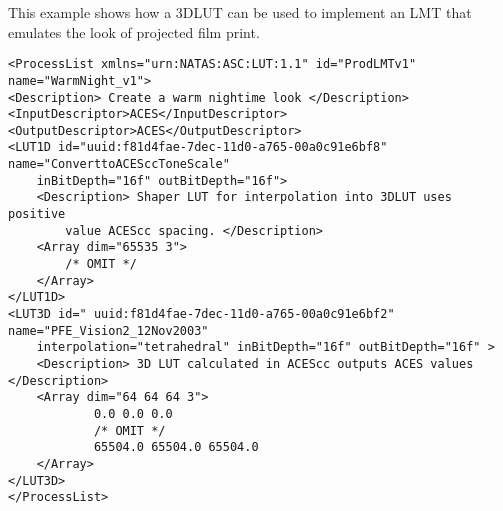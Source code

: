 \label{appendixB}

This example shows how a 3DLUT can be used to implement an LMT that emulates the look of projected film print.

\vspace{18pt}

\begin{lstlisting}
<ProcessList xmlns="urn:NATAS:ASC:LUT:1.1" id="ProdLMTv1" name="WarmNight_v1">
<Description> Create a warm nightime look </Description>
<InputDescriptor>ACES</InputDescriptor>
<OutputDescriptor>ACES</OutputDescriptor>
<LUT1D id="uuid:f81d4fae-7dec-11d0-a765-00a0c91e6bf8" name="ConverttoACESccToneScale" 
    inBitDepth="16f" outBitDepth="16f">
	<Description> Shaper LUT for interpolation into 3DLUT uses positive 
	    value ACEScc spacing. </Description>
	<Array dim="65535 3">
		/* OMIT */
	</Array>
</LUT1D>
<LUT3D id=" uuid:f81d4fae-7dec-11d0-a765-00a0c91e6bf2" name="PFE_Vision2_12Nov2003" 
    interpolation="tetrahedral" inBitDepth="16f" outBitDepth="16f" >
	<Description> 3D LUT calculated in ACEScc outputs ACES values </Description>
	<Array dim="64 64 64 3">
			0.0 0.0 0.0
			/* OMIT */
			65504.0 65504.0 65504.0
	</Array>
</LUT3D>
</ProcessList>
\end{lstlisting}
